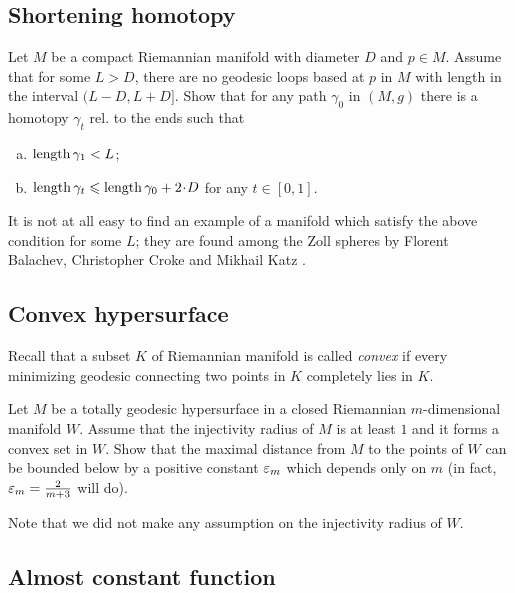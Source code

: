 \subsection*{Shortening homotopy}
\label{short-homotopy}

\begin{pr}
Let $M$ be a compact Riemannian manifold with diameter $D$ and $p\in M$.
Assume that for some $L>D$,
there are no geodesic loops based at $p$ in $M$
with length in the interval $(L-D,L+ D]$.
Show that for any path $\gamma_0$ in $(M,g)$
there is a homotopy $\gamma_t$ rel. to the ends
such that 
\begin{enumerate}[a)]
\item $\operatorname{\rm length} \gamma_1<L$;
\item $\length \gamma_t\le \length \gamma_0+2\cdot D$ for any $t\in[0,1]$.
 
\end{enumerate}
\end{pr}

It is not at all easy to find an example of a manifold  which satisfy the above condition for some $L$;
they are found among the Zoll spheres
by Florent Balachev, Christopher Croke and Mikhail Katz \cite[see][]{balacheff-croke-katz}.



\subsection*{Convex hypersurface}
\label{Convex hypersurface}

Recall that a subset $K$ of Riemannian manifold is called \emph{convex} if every minimizing geodesic connecting two  points in $K$ completely lies in $K$. 

\begin{pr}
Let $M$ be a totally geodesic hypersurface 
in a closed Riemannian $m$-dimensional manifold $W$.
Assume that the injectivity radius of $M$ is at least $1$
and it forms a convex set in $W$.
Show that the maximal distance from $M$ to the points of $W$ can be bounded below by a positive constant $\varepsilon_m$ which depends only on $m$ (in fact, $\varepsilon_m=\tfrac2{m+3}$ will do).
\end{pr}

Note that we did not make any assumption on the injectivity radius of $W$.

\subsection*{Almost constant function}
\label{Almost constant function}

